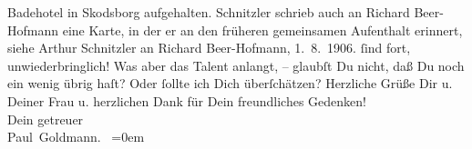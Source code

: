\begin{ledgroupsized}[t]{13cm}
{{{                     Badehotel in Skodsborg aufgehalten. Schnitzler schrieb auch an Richard
                     Beer-Hofmann eine Karte, in der er an den früheren gemeinsamen Aufenthalt
                  erinnert, siehe Arthur Schnitzler an Richard Beer-Hofmann, 1. 8. 1906.}}}\label{K-L03249-2h}
               ſind fort, unwiederbringlich! Was aber das Talent anlangt, – glaubſt Du nicht, daß Du
               noch ein wenig übrig haſt? Oder ſollte ich Dich überſchätzen?\pend
           \pstart
           Herzliche Grüße Dir u. Deiner Frau u. herzlichen Dank für Dein freundliches Gedenken! {\\[\baselineskip]}Dein getreuer
                  {\\[\baselineskip]}\spacefill\mbox{Paul Goldmann. }\pend
           \leftskip=0em{}
         
         \endnumbering{}\end{ledgroupsized}\begin{anhang}\end{anhang}\newcommand{\dateiname}{L03249}\newcommand{\titel}{Paul Goldmann an Arthur Schnitzler, 3. 8. 1906}\newcommand{\editorInnen}{Martin Anton Müller und Laura Untner}
      